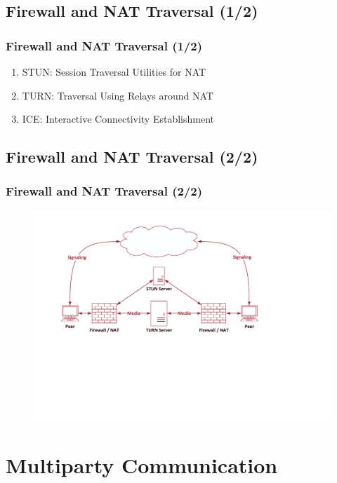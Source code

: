 \documentclass{beamer}
\begin{document}
\subsection{Firewall and NAT Traversal (1/2)}
\begin{frame}
\frametitle{Firewall and NAT Traversal (1/2)}
	\begin{enumerate}
		\item STUN: Session Traversal Utilities for NAT
		\item TURN: Traversal Using Relays around NAT
		\item ICE: Interactive Connectivity Establishment
	\end{enumerate}
\end{frame}

\subsection{Firewall and NAT Traversal (2/2)}
\begin{frame}
	\frametitle{Firewall and NAT Traversal (2/2)}
		\begin{figure}[h!]
			\centering
			\includegraphics[scale=0.55]{figs/nat.pdf}
		\end{figure}
\end{frame}
\section{Multiparty Communication}
\end{document}
